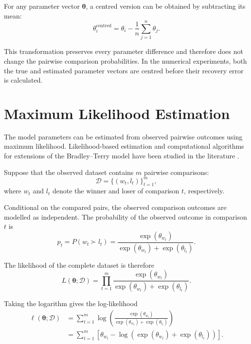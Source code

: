 \documentclass[12pt,oneside]{report}
\begin{document}
For any parameter vector \(\boldsymbol{\theta}\), a centred version can
be obtained by subtracting its mean:
\begin{equation}
    \theta_i^{\mathrm{centred}}
    =
    \theta_i
    -
    \frac{1}{n}
    \sum_{j=1}^{n}\theta_j.
    \label{eq:btl-centring}
\end{equation}

This transformation preserves every parameter difference and therefore
does not change the pairwise comparison probabilities. In the numerical
experiments, both the true and estimated parameter vectors are centred
before their recovery error is calculated.


\section{Maximum Likelihood Estimation}
The model parameters can be estimated from observed pairwise
outcomes using maximum likelihood. Likelihood-based estimation
and computational algorithms for extensions of the
Bradley--Terry model have been studied in the literature
\citep{hunter2004}.

Suppose that the observed dataset contains \(m\) pairwise comparisons:
\begin{equation}
    \mathcal{D}
    =
    \{(w_t,l_t)\}_{t=1}^{m},
\end{equation}
where \(w_t\) and \(l_t\) denote the winner and loser of comparison
\(t\), respectively.

Conditional on the compared pairs, the observed comparison outcomes are
modelled as independent. The probability of the observed outcome in
comparison \(t\) is
\begin{equation}
    p_t
    =
    P(w_t\succ l_t)
    =
    \frac{\exp(\theta_{w_t})}
    {\exp(\theta_{w_t})+\exp(\theta_{l_t})}.
    \label{eq:btl-observation-probability}
\end{equation}

The likelihood of the complete dataset is therefore
\begin{equation}
    L(\boldsymbol{\theta};\mathcal{D})
    =
    \prod_{t=1}^{m}
    \frac{\exp(\theta_{w_t})}
    {\exp(\theta_{w_t})+\exp(\theta_{l_t})}.
    \label{eq:btl-likelihood}
\end{equation}

Taking the logarithm gives the log-likelihood
\begin{align*}
    \ell(\boldsymbol{\theta};\mathcal{D})
    &=
    \sum_{t=1}^{m}
    \log
    \left(
        \frac{\exp(\theta_{w_t})}
        {\exp(\theta_{w_t})+\exp(\theta_{l_t})}
    \right)
    \\
    &=
    \sum_{t=1}^{m}
    \left[
        \theta_{w_t}
        -
        \log
        \left(
            \exp(\theta_{w_t})
            +
            \exp(\theta_{l_t})
        \right)
    \right].
    \label{eq:btl-log-likelihood}
\end{align*}
\end{document}
